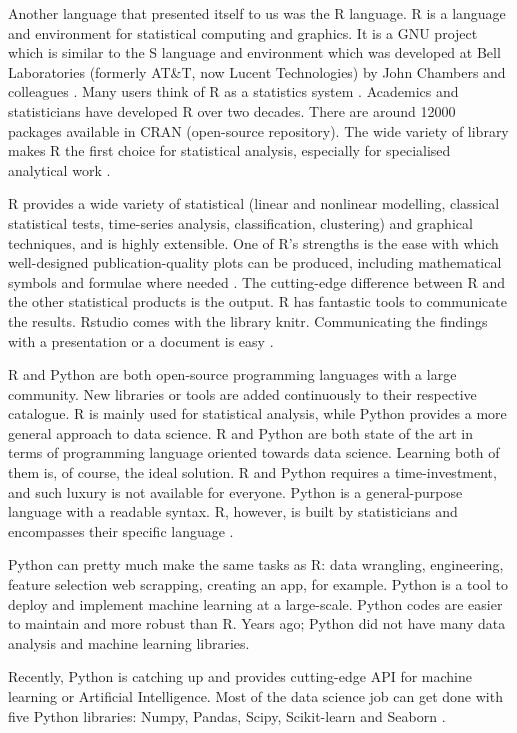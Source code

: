 	Another language that presented itself to us was the R language. R is a language and environment for statistical computing and graphics. It is a GNU project which is similar to the S language and environment which was developed at Bell Laboratories (formerly AT\&T, now Lucent Technologies) by John Chambers and colleagues \cite{r_project}. Many users think of R as a statistics system \cite{r_project}. Academics and statisticians have developed R over two decades. There are around 12000 packages available in CRAN (open-source repository). The wide variety of library makes R the first choice for statistical analysis, especially for specialised analytical work \cite{r_vs_py}.
	
	R provides a wide variety of statistical (linear and nonlinear modelling, classical statistical tests, time-series analysis, classification, clustering) and graphical techniques, and is highly extensible. One of R's strengths is the ease with which well-designed publication-quality plots can be produced, including mathematical symbols and formulae where needed \cite{r_project}. The cutting-edge difference between R and the other statistical products is the output. R has fantastic tools to communicate the results. Rstudio comes with the library knitr. Communicating the findings with a presentation or a document is easy \cite{r_vs_py}.
	
	R and Python are both open-source programming languages with a large community. New libraries or tools are added continuously to their respective catalogue. R is mainly used for statistical analysis, while Python provides a more general approach to data science.
	R and Python are both state of the art in terms of programming language oriented towards data science. Learning both of them is, of course, the ideal solution. R and Python requires a time-investment, and such luxury is not available for everyone. Python is a general-purpose language with a readable syntax. R, however, is built by statisticians and encompasses their specific language \cite{r_vs_py}.
	
	Python can pretty much make the same tasks as R: data wrangling, engineering, feature selection web scrapping, creating an app, for example. Python is a tool to deploy and implement machine learning at a large-scale. Python codes are easier to maintain and more robust than R. Years ago; Python did not have many data analysis and machine learning libraries. 
	
	Recently, Python is catching up and provides cutting-edge API for machine learning or Artificial Intelligence. Most of the data science job can get done with five Python libraries: Numpy, Pandas, Scipy, Scikit-learn and Seaborn \cite{r_vs_py}.
	
